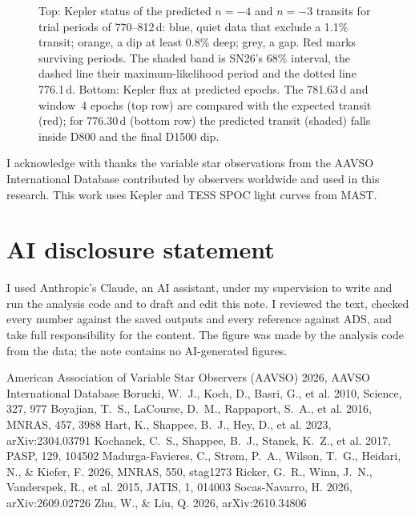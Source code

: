 \documentclass{aastex701}
\begin{document}
\begin{figure}[ht!]
\caption{Top: Kepler status of the predicted $n=-4$ and $n=-3$ transits for trial periods of 770--812\,d: blue,
quiet data that exclude a 1.1\% transit; orange, a dip at least 0.8\% deep; grey, a gap. Red marks surviving
periods. The shaded band is SN26's 68\% interval, the dashed line their maximum-likelihood period and the dotted
line 776.1\,d. Bottom: Kepler flux at predicted epochs. The 781.63\,d and window~4 epochs (top row) are compared
with the expected transit (red); for 776.30\,d (bottom row) the predicted transit (shaded) falls inside D800 and
the final D1500 dip.\label{fig:alias}}
\end{figure}

\begin{acknowledgments}
I acknowledge with thanks the variable star observations from the AAVSO International Database contributed by
observers worldwide and used in this research. This work uses Kepler
 and TESS SPOC
 light curves from MAST.
\end{acknowledgments}


\section*{AI disclosure statement}
I used Anthropic's Claude, an AI assistant, under my supervision to write and run the analysis code and to draft
and edit this note. I reviewed the text, checked every number against the saved outputs and every reference
against ADS, and take full responsibility for the content. The figure was made by the analysis code from the
data; the note contains no AI-generated figures.

\begin{thebibliography}{}
 American Association of Variable Star Observers (AAVSO) 2026, AAVSO International Database
 Borucki, W.~J., Koch, D., Basri, G., et al. 2010, Science, 327, 977
 Boyajian, T.~S., LaCourse, D.~M., Rappaport, S.~A., et al. 2016, MNRAS, 457, 3988
 Hart, K., Shappee, B.~J., Hey, D., et al. 2023, arXiv:2304.03791
 Kochanek, C.~S., Shappee, B.~J., Stanek, K.~Z., et al. 2017, PASP, 129, 104502
 Madurga-Favieres, C., Str{\o}m, P.~A., Wilson, T.~G., Heidari, N., \& Kiefer, F. 2026, MNRAS, 550, stag1273
 Ricker, G.~R., Winn, J.~N., Vanderspek, R., et al. 2015, JATIS, 1, 014003
 Socas-Navarro, H. 2026, arXiv:2609.02726
 Zhu, W., \& Liu, Q. 2026, arXiv:2610.34806
\end{thebibliography}
\end{document}
